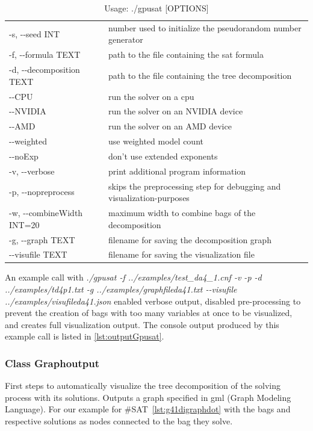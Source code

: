 \documentclass[a4paper, 12pt]{scrartcl}
\begin{document}
\begin{longtable}{ll}
	\caption{Usage: ./gpusat [OPTIONS]
		\label{tab:optionsgpusat}}\\
	\hline
	\vspace{0.5ex}
	\endfirsthead
-s, -{}-seed INT&  number used to initialize the pseudorandom number generator\\
	-f, -{}-formula TEXT &  path to the file containing the sat formula\\
	-d, -{}-decomposition TEXT  &   path to the file containing the tree decomposition\\
	-{}-CPU                   &    run the solver on a cpu\\
	-{}-NVIDIA                &    run the solver on an NVIDIA device\\
	-{}-AMD                   &    run the solver on an AMD device\\
	-{}-weighted              &   use weighted model count\\
	-{}-noExp                 &    don't use extended exponents\\
	-v, -{}-verbose            &    print additional program information\\
	-p, -{}-nopreprocess       &    skips the preprocessing step for debugging and visualization-purposes\\
	-w, -{}-combineWidth INT=20&    maximum width to combine bags of the decomposition\\
	-g, -{}-graph TEXT         &    filename for saving the decomposition graph\\
	-{}-visufile TEXT         &    filename for saving the visualization file\\

\end{longtable}
               
          


An example call with \textit{./gpusat -f ../examples/test\_da4\_1.cnf -v -p -d ../examples/td4p1.txt  -g ../examples/graphfileda41.txt -{}-visufile ../examples/visufileda41.json} enabled verbose output, disabled pre-processing to prevent the creation of bags with too many variables at once to be visualized, and creates full visualization output. 
The console output produced by this example call is listed in \ref{lst:outputGpusat}.




\subsubsection{Class Graphoutput}\label{chagraphoutput}
First steps to automatically visualize the tree decomposition of the solving process with its solutions.
Outputs a graph specified in gml\cite{Himsolt2010GMLAP} (Graph Modeling Language).
For our example for \#SAT~\ref{lst:g41digraphdot} with the bags and respective solutions as nodes connected to the bag they solve.
\end{document}
